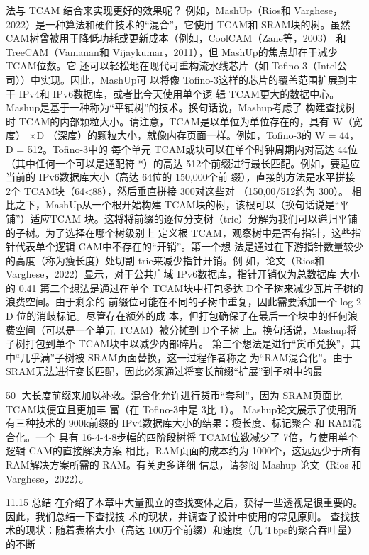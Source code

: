 法与 TCAM 结合来实现更好的效果呢？
例如，MashUp（Rios和 Varghese，2022）是一种算法和硬件技术的“混合”，它使用 TCAM和
SRAM块的树。虽然 CAM树曾被用于降低功耗或更新成本（例如，CoolCAM（Zane等，2003）
和 TreeCAM（Vamanan和 Vijaykumar，2011），但 MashUp的焦点却在于减少 TCAM位数。它
还可以轻松地在现代可重构流水线芯片（如 Tofino-3（Intel公司））中实现。因此，MashUp可
以将像 Tofino-3这样的芯片的覆盖范围扩展到主干 IPv4和 IPv6数据库，或者比今天使用单个逻
辑 TCAM更大的数据中心。Mashup是基于一种称为“平铺树”的技术。换句话说，Mashup考虑了
构建查找树时 TCAM的内部颗粒大小。请注意，TCAM是以单位为单位存在的，具有 W（宽度）
×D
（深度）的颗粒大小，就像内存页面一样。例如，Tofino-3的 W = 44，D = 512。Tofino-3中的
每个单元 TCAM或块可以在单个时钟周期内对高达 44位（其中任何一个可以是通配符 *）的高达
512个前缀进行最长匹配。例如，要适应当前的 IPv6数据库大小（高达 64位的 150,000个前
缀），直接的方法是水平拼接 2个 TCAM块（64<88），然后垂直拼接 300对这些对
（150,00/512约为 300）。
相比之下，MashUp从一个根开始构建 TCAM块的树，该根可以（换句话说是“平铺”）适应TCAM
 块。这将将前缀的逐位分支树（trie）分解为我们可以递归平铺的子树。为了选择在哪个树级别上
定义根 TCAM，观察树中是否有指针，这些指针代表单个逻辑 CAM中不存在的“开销”。第一个想
           法是通过在下游指针数量较少的高度（称为瘦长度）处切割 trie来减少指针开销。例
如，论文（Rios和 Varghese，2022）显示，对于公共广域 IPv6数据库，指针开销仅为总数据库
大小的 0.41%
第二个想法是通过在单个 TCAM块中打包多达 D个子树来减少瓦片子树的浪费空间。由于剩余的
前缀位可能在不同的子树中重复，因此需要添加一个 log 2 D 位的消歧标记。尽管存在额外的成
本，但打包确保了在最后一个块中的任何浪费空间（可以是一个单元 TCAM）被分摊到 D个子树
上。换句话说，Mashup将子树打包到单个 TCAM块中以减少内部碎片。
第三个想法是进行“货币兑换”，其中“几乎满”子树被 SRAM页面替换，这一过程作者称之
为“RAM混合化”。由于 SRAM无法进行变长匹配，因此必须通过将变长前缀“扩展”到子树中的最

                                                           50
大长度前缀来加以补救。混合化允许进行货币“套利”，因为 SRAM页面比 TCAM块便宜且更加丰
富（在 Tofino-3中是 3比 1）。
Mashup论文展示了使用所有三种技术的 900k前缀的 IPv4数据库大小的结果：瘦长度、标记聚合
和 RAM混合化。一个
具有 16-4-4-8步幅的四阶段树将 TCAM位数减少了 7倍，与使用单个逻辑 CAM的直接解决方案
相比，RAM页面的成本约为 1000个，这远远少于所有 RAM解决方案所需的 RAM。有关更多详细
信息，请参阅 Mashup 论文（Rios 和 Varghese，2022）。



11.15 总结
在介绍了本章中大量孤立的查找变体之后，获得一些透视是很重要的。因此，我们总结一下查找技
术的现状，并调查了设计中使用的常见原则。
查找技术的现状：随着表格大小（高达 100万个前缀）和速度（几 Tbps的聚合吞吐量）的不断



